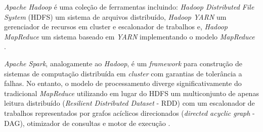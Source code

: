 \emph{Apache Hadoop} é uma coleção de ferramentas incluindo: \emph{Hadoop
Distributed File System} (HDFS) um sistema de arquivos distribuído, \emph{Hadoop
YARN} um gerenciador de recursos em cluster e escalonador de trabalhos e,
\emph{Hadoop MapReduce} um sistema baseado em \emph{YARN} implementando o modelo
\emph{MapReduce} \cite{ApacheHadoop2020}.





\emph{Apache Spark}, analogamente ao \emph{Hadoop}, é um \emph{framework} para
construção de sistemas de computação distribuída em \emph{cluster} com garantias
de tolerância a falhas. No entanto, o modelo de processamento diverge
significativamente do tradicional \emph{MapReduce} utilizando em lugar do HDFS
um multiconjunto de apenas leitura distribuído (\emph{Resilient Distributed Dataset}
- RDD) com um escalonador de trabalhos representados por grafos acíclicos
direcionados (\emph{directed acyclic graph} - DAG), otimizador de consultas e
motor de execução \cite{ApacheSpark2020}.


